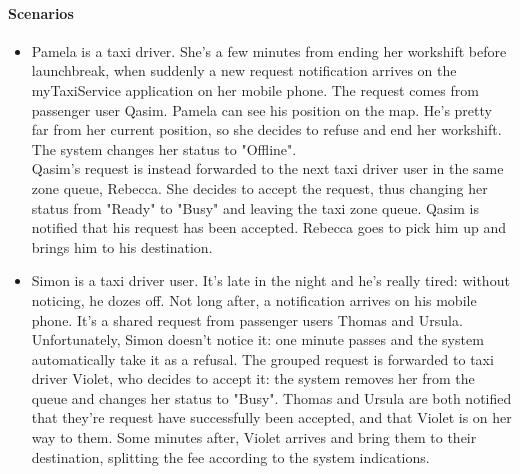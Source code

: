 \paragraph{Scenarios}
		\begin{itemize}
			\item Pamela is a taxi driver. She's a few minutes from ending her workshift before launchbreak, when suddenly a new request notification arrives on the myTaxiService application on her mobile phone. The request comes from passenger user Qasim. Pamela can see his position on the map. He's pretty far from her current position, so she decides to refuse and end her workshift. The system changes her status to "Offline".\\
			Qasim's request is instead forwarded to the next taxi driver user in the same zone queue, Rebecca. She decides to accept the request, thus changing her status from "Ready" to "Busy" and leaving the taxi zone queue. Qasim is notified that his request has been accepted. Rebecca goes to pick him up and brings him to his destination.
			
			\item Simon is a taxi driver user. It's late in the night and he's really tired: without noticing, he dozes off. Not long after, a notification arrives on his mobile phone. It's a shared request from passenger users Thomas and Ursula. Unfortunately, Simon doesn't notice it: one minute passes and the system automatically take it as a refusal. The grouped request is forwarded to taxi driver Violet, who decides to accept it: the system removes her from the queue and changes her status to "Busy". Thomas and Ursula are both notified that they're request have successfully been accepted, and that Violet is on her way to them. Some minutes after, Violet arrives and bring them to their destination, splitting the fee according to the system indications.
		\end{itemize}
		
